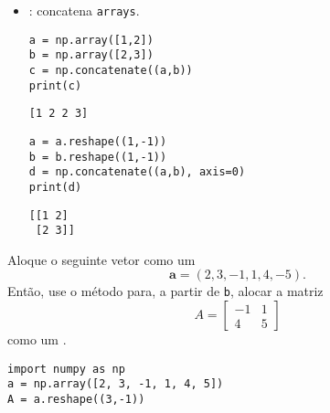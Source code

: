 \begin{itemize}
\begin{verbatim}
[[1 3]
 [2 4]]
\end{verbatim}

\item \hl{\PYTHONnumpyDOTconcatenate}: concatena \texttt{arrays}.

\begin{lstlisting}[framexrightmargin=-2.4em]
a = np.array([1,2])
b = np.array([2,3])
c = np.concatenate((a,b))
print(c)
\end{lstlisting}

\begin{verbatim}
[1 2 2 3]
\end{verbatim}

\begin{lstlisting}[framexrightmargin=-2.4em]
a = a.reshape((1,-1))
b = b.reshape((1,-1))
d = np.concatenate((a,b), axis=0)
print(d)
\end{lstlisting}

\begin{verbatim}
[[1 2]
 [2 3]]
\end{verbatim}

  \end{itemize}

\begin{exer}
  Aloque o seguinte vetor como um {\PYTHONnumpyDOTarray}
  \begin{equation}
    \pmb{a} = (2, 3, -1, 1, 4, -5). 
  \end{equation}
  Então, use o método {\PYTHONnumpyDOTreshape} para, a partir de \texttt{b}, alocar a matriz
  \begin{equation}
    A = \begin{bmatrix}
      -1 & 1 \\
      4 & 5
    \end{bmatrix}
  \end{equation}
  como um {\PYTHONnumpyDOTarray}.
\end{exer}
\begin{resp}
  
\begin{lstlisting}
import numpy as np
a = np.array([2, 3, -1, 1, 4, 5])
A = a.reshape((3,-1))
\end{lstlisting}

\end{resp}

